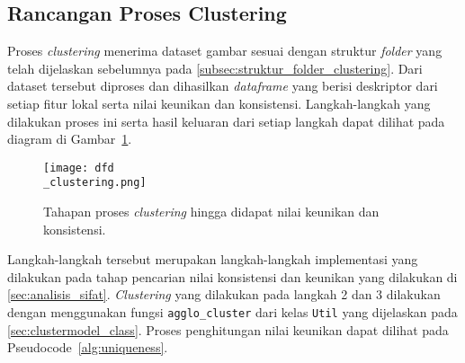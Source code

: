 \subsection{Rancangan Proses Clustering}
\label{subsec:rancangan_proses_clustering}
Proses \textit{clustering} menerima dataset gambar sesuai dengan struktur \textit{folder} yang telah dijelaskan sebelumnya pada \ref{subsec:struktur_folder_clustering}. Dari dataset tersebut diproses dan dihasilkan \textit{dataframe} yang berisi deskriptor dari setiap fitur lokal serta nilai keunikan dan konsistensi. Langkah-langkah yang dilakukan proses ini serta hasil keluaran dari setiap langkah dapat dilihat pada diagram di Gambar~\ref{fig:dfd_clustering}.
\begin{figure}[H]
	\centering
	\texttt{[image: dfd\\\_clustering.png]}
	\caption{Tahapan proses \textit{clustering} hingga didapat nilai keunikan dan konsistensi.}
	\label{fig:dfd_clustering}
\end{figure}
Langkah-langkah tersebut merupakan langkah-langkah implementasi yang dilakukan pada tahap pencarian nilai konsistensi dan keunikan yang dilakukan di \ref{sec:analisis_sifat}. \textit{Clustering} yang dilakukan pada langkah 2 dan 3 dilakukan dengan menggunakan fungsi \texttt{agglo\_cluster} dari kelas \texttt{Util} yang dijelaskan pada \ref{sec:clustermodel_class}. Proses penghitungan nilai keunikan dapat dilihat pada Pseudocode~\ref{alg:uniqueness}. \\

